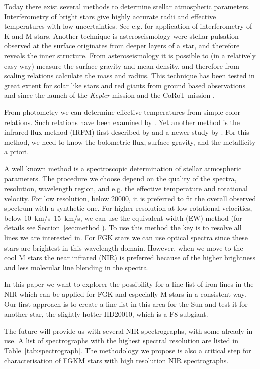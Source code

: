 \documentclass{aa}
\begin{document}
Today there exist several methods to determine stellar atmospheric
parameters. Interferometry of bright stars give highly accurate
radii and effective temperatures with low uncertainties. See e.g.
\cite{Boyajian2012} for application of interferometry of K and M stars.
Another technique is asteroseismology were stellar pulsation observed
at the surface originates from deeper layers of a star, and therefore
reveals the inner structure. From asteroseismology it is possible to (in
a relatively easy way) measure the surface gravity and mean density,
and therefore from scaling relations \citep{Kjeldsen1995} calculate
the mass and radius. This technique has been tested in great extent
for solar like stars and red giants from ground based observations and
since the launch of the \emph{Kepler} mission and the CoRoT mission
\citep{Michel2008,Huber2011,Huber2012}.

From photometry we can determine effective temperatures from
simple color relations. Such relations have been examined by
\cite{Ramirez2005a}. Yet another method is the infrared flux method
(IRFM) first described by \cite{Blackwell1977} and a newer study by
\cite{Ramirez2005b,Casagrande2010}. For this method, we need to know the
bolometric flux, surface gravity, and the metallicity a priori.

A well known method is a spectroscopic determination of stellar
atmospheric parameters. The procedure we choose depend on the quality
of the spectra, resolution, wavelength region, and e.g. the effective
temperature and rotational velocity. For low resolution, below 20000,
it is preferred to fit the overall observed spectrum with a synthetic
one. For higher resolution at low rotational velocities, below
\SIrange{10}{15}{km/s}, we can use the equivalent width (EW) method
(for details see Section~\ref{sec:method}). To use this method the
key is to resolve all lines we are interested in. For FGK stars we can
use optical spectra since these stars are brightest in this wavelength
domain. However, when we move to the cool M stars the near infrared
(NIR) is preferred because of the higher brightness and less molecular
line blending in the spectra.

In this paper we want to explorer the possibility for a line list of
iron lines in the NIR which can be applied for FGK and especially M
stars in a consistent way. Our first approach is to create a line list
in this area for the Sun and test it for another star, the slightly
hotter HD20010, which is a F8 subgiant.

The future will provide us with several NIR spectrographs, with some
already in use. A list of spectrographs with the highest spectral
resolution are listed in Table~\ref{tab:spectrograph}. The methodology
we propose is also a critical step for characterisation of FGKM stars
with high resolution NIR spectrographs.
\end{document}
